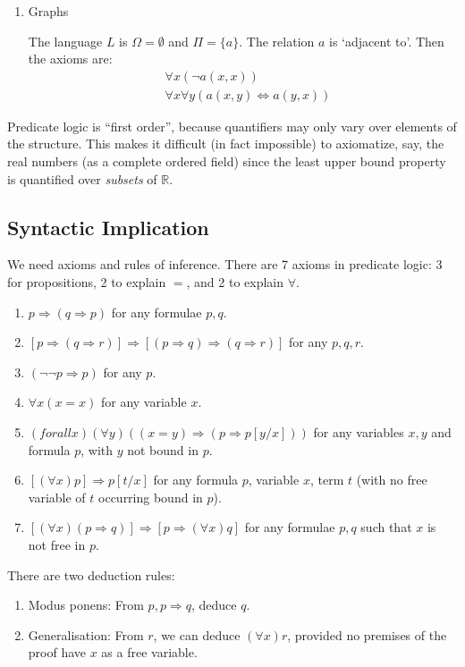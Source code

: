 \documentclass{article}
\theoremstyle{definition}
\numberwithin{definition}{section}
\begin{document}
\begin{enumerate}[i]
  \item Graphs

    The language $L$ is $\Omega = \emptyset$ and $\Pi = \{a\}$. 
    The relation $a$ is `adjacent to'. Then the axioms are: 
    \begin{align*}
      & \forall x (\neg a(x,x)) \\
      & \forall x \forall y (a(x,y) \iff a(y,x))
    \end{align*}

\end{enumerate}

Predicate logic is ``first order'', because quantifiers may only vary 
over elements of the structure. This makes it difficult (in fact impossible) 
to axiomatize, say, the real numbers (as a complete ordered field) 
since the least upper bound property is quantified over \textit{subsets} 
of $\mathbb{R}$. 

\subsection{Syntactic Implication}
We need axioms and rules of inference. 
There are 7 axioms in predicate logic: 
  3 for propositions, 
  2 to explain $=$, 
  and 2 to explain $\forall$. 
\begin{enumerate}
\item $p \Rightarrow (q \Rightarrow p)$ for any formulae $p,q$. 
\item $[p \Rightarrow (q \Rightarrow r)] \Rightarrow 
        [(p \Rightarrow q) \Rightarrow (q \Rightarrow r)]$ for any $p,q,r$.
\item $(\neg \neg p \Rightarrow p)$ for any $p$.
\item $\forall x (x=x)$ for any variable $x$. 
\item $(forall x) (\forall y) ((x=y) \Rightarrow (p \Rightarrow p[y/x]))$ for any variables $x,y$ and formula $p$, with $y$ not bound in $p$. 
\item $[(\forall x) p] \Rightarrow p[t/x]$ for any formula $p$, variable $x$, term $t$ (with no free variable of $t$ occurring bound in $p$). 
\item $[(\forall x) (p \Rightarrow q)] \Rightarrow [p \Rightarrow (\forall x)q]$ for any formulae $p,q$ such that $x$ is not free in $p$. 
\end{enumerate}
There are two deduction rules: 
\begin{enumerate}
\item Modus ponens: From $p,p \Rightarrow q$, deduce $q$.
\item Generalisation: From $r$, we can deduce $(\forall x) r$, provided no premises of the proof have $x$ as a free variable.
\end{enumerate}
\end{document}
